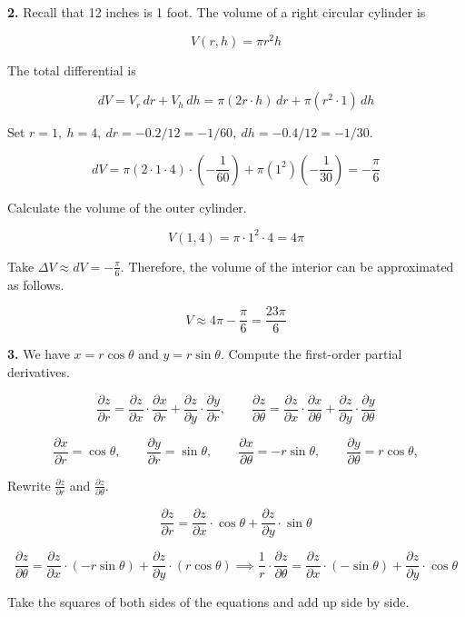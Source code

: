 \documentclass{article}
\begin{document}
\vspace{1em}

\textbf{2.} Recall that 12 inches is 1 foot. The volume of a right circular cylinder is

\[V(r,h)=\pi r^2 h\]

The total differential is

\[dV=V_r\,dr+V_h\,dh=\pi\left(2r\cdot h\right)\,dr+\pi\left(r^2\cdot 1\right)\,dh\]

Set $r=1,\:h=4,\:dr=-0.2/12=-1/60,\:dh=-0.4/12=-1/30$.

\[dV=\pi\left(2\cdot1\cdot 4\right)\cdot\left(-\frac1{60}\right)+\pi\left(1^2\right)\left(-\frac1{30}\right)=-\frac\pi6\]

Calculate the volume of the outer cylinder.

\[V(1,4)=\pi\cdot1^2\cdot4=4\pi\]

Take $\displaystyle\Delta V\approx dV=-\frac\pi6$. Therefore, the volume of the interior can be approximated as follows.

\[\boxed{V\approx4\pi-\frac\pi6=\frac{23\pi}6}\]

\newpage

\textbf{3.} We have $x=r\cos\theta$ and $y=r\sin\theta$. Compute the first-order partial derivatives.

\[\frac{\partial z}{\partial r}=\frac{\partial z}{\partial x}\cdot\frac{\partial x}{\partial r}+\frac{\partial z}{\partial y}\cdot\frac{\partial y}{\partial r},\qquad\frac{\partial z}{\partial \theta}=\frac{\partial z}{\partial x}\cdot\frac{\partial x}{\partial \theta}+\frac{\partial z}{\partial y}\cdot\frac{\partial y}{\partial \theta}\]

\[\frac{\partial x}{\partial r}=\cos\theta,\qquad\frac{\partial y}{\partial r}=\sin\theta,\qquad\frac{\partial x}{\partial \theta}=-r\sin\theta,\qquad\frac{\partial y}{\partial\theta}=r\cos\theta,\]

Rewrite $\displaystyle\frac{\partial z}{\partial r}$ and $\displaystyle\frac{\partial z}{\partial\theta}$.

\[\frac{\partial z}{\partial r}=\frac{\partial z}{\partial x}\cdot\cos\theta+\frac{\partial z}{\partial y}\cdot\sin\theta\]

\[\frac{\partial z}{\partial\theta}=\frac{\partial z}{\partial x}\cdot(-r\sin\theta)+\frac{\partial z}{\partial y}\cdot(r\cos\theta)\implies\frac1r\cdot\frac{\partial z}{\partial\theta}=\frac{\partial z}{\partial x}\cdot(-\sin\theta)+\frac{\partial z}{\partial y}\cdot\cos\theta\]

Take the squares of both sides of the equations and add up side by side.
\end{document}

